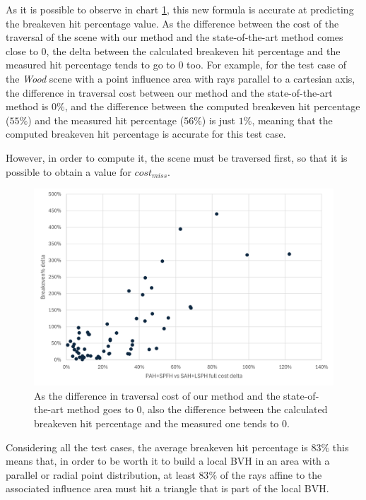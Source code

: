 \documentclass{PoliMi_MasterThesis}
\begin{document}
As it is possible to observe in chart \ref{fig:breakeven_hit_perc_accuracy}, this new formula is accurate at predicting the breakeven hit percentage value. As the difference between the cost of the traversal of the scene with our method and the state-of-the-art method comes close to 0, the delta between the calculated breakeven hit percentage and the measured hit percentage tends to go to 0 too. For example, for the test case of the \textit{Wood} scene with a point influence area with rays parallel to a cartesian axis, the difference in traversal cost between our method and the state-of-the-art method is $0\%$, and the difference between the computed breakeven hit percentage ($55\%$) and the measured hit percentage ($56\%$) is just $1\%$, meaning that the computed breakeven hit percentage is accurate for this test case.

However, in order to compute it, the scene must be traversed first, so that it is possible to obtain a value for $cost_{miss}$.

\begin{figure}[H] 
	\centering
	\includegraphics[width=\textwidth]{Images/breakeven_hit_perc_accuracy.png}
	\caption{As the difference in traversal cost of our method and the state-of-the-art method goes to 0, also the difference between the calculated breakeven hit percentage and the measured one tends to 0.}
	\label{fig:breakeven_hit_perc_accuracy}
\end{figure}

Considering all the test cases, the average breakeven hit percentage is $83\%$ this means that, in order to be worth it to build a local BVH in an area with a parallel or radial point distribution, at least $83\%$ of the rays affine to the associated influence area must hit a triangle that is part of the local BVH.
\end{document}
